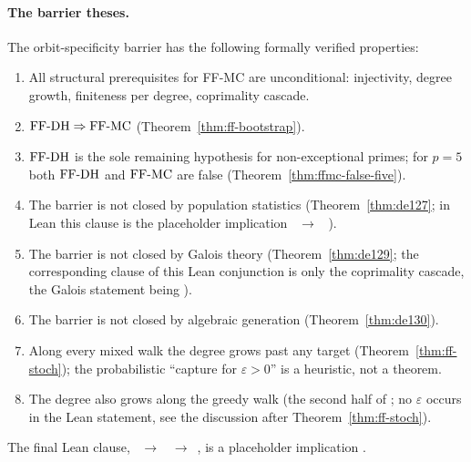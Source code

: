 \paragraph{The barrier theses.}

\begin{theorem}
\label{thm:barrier-thesis}
The orbit-specificity barrier has the following formally verified
properties:
\begin{enumerate}[nosep,label=(\roman*)]
\item All structural prerequisites for FF-MC are unconditional:
  injectivity, degree growth, finiteness per degree, coprimality
  cascade.
\item $\mathrm{FF\text{-}DH} \Rightarrow \mathrm{FF\text{-}MC}$ (Theorem~\ref{thm:ff-bootstrap}).
\item $\mathrm{FF\text{-}DH}$ is the sole remaining hypothesis for non-exceptional
  primes; for $p = 5$ both $\mathrm{FF\text{-}DH}$ and $\mathrm{FF\text{-}MC}$ are false
  (Theorem~\ref{thm:ffmc-false-five}).
\item The barrier is not closed by population statistics
  (Theorem~\ref{thm:de127}; in Lean this clause is the placeholder
  implication ~$\to$~
  \placeholder).
\item The barrier is not closed by Galois theory
  (Theorem~\ref{thm:de129}; the corresponding clause of this Lean
  conjunction is only the coprimality cascade, the Galois statement
  being ).
\item The barrier is not closed by algebraic generation
  (Theorem~\ref{thm:de130}).
\item Along every mixed walk the degree grows past any target
  (Theorem~\ref{thm:ff-stoch}); the probabilistic ``capture for
  $\varepsilon > 0$'' is a heuristic, not a theorem.
\item The degree also grows along the greedy walk
  (the second half of ; no $\varepsilon$ occurs
  in the Lean statement, see the discussion after
  Theorem~\ref{thm:ff-stoch}).
\end{enumerate}
The final Lean clause, ~$\to$
~$\to$~, is a
placeholder implication \placeholder.
\end{theorem}

